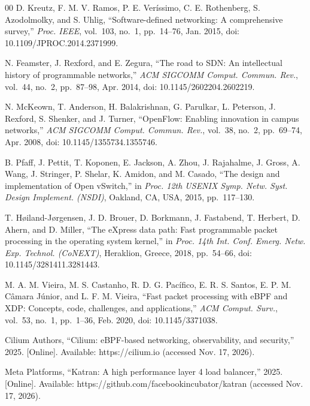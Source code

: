 \documentclass[conference]{IEEEtran}
\begin{document}
\begin{thebibliography}{00}
 D. Kreutz, F. M. V. Ramos, P. E. Ver\'issimo,
C. E. Rothenberg, S. Azodolmolky, and S. Uhlig, ``Software-defined networking:
A comprehensive survey,'' \textit{Proc. IEEE}, vol.~103, no.~1, pp.~14--76,
Jan. 2015, doi: 10.1109/JPROC.2014.2371999.

 N. Feamster, J. Rexford, and E. Zegura, ``The road
to SDN: An intellectual history of programmable networks,'' \textit{ACM
SIGCOMM Comput. Commun. Rev.}, vol.~44, no.~2, pp.~87--98, Apr. 2014,
doi: 10.1145/2602204.2602219.

 N. McKeown, T. Anderson, H. Balakrishnan,
G. Parulkar, L. Peterson, J. Rexford, S. Shenker, and J. Turner, ``OpenFlow:
Enabling innovation in campus networks,'' \textit{ACM SIGCOMM Comput. Commun.
Rev.}, vol.~38, no.~2, pp.~69--74, Apr. 2008, doi: 10.1145/1355734.1355746.

 B. Pfaff, J. Pettit, T. Koponen, E. Jackson, A. Zhou,
J. Rajahalme, J. Gross, A. Wang, J. Stringer, P. Shelar, K. Amidon, and
M. Casado, ``The design and implementation of Open vSwitch,'' in \textit{Proc.
12th USENIX Symp. Netw. Syst. Design Implement. (NSDI)}, Oakland, CA, USA,
2015, pp.~117--130.

 T. H{\o}iland-J{\o}rgensen, J. D. Brouer,
D. Borkmann, J. Fastabend, T. Herbert, D. Ahern, and D. Miller, ``The eXpress
data path: Fast programmable packet processing in the operating system
kernel,'' in \textit{Proc. 14th Int. Conf. Emerg. Netw. Exp. Technol.
(CoNEXT)}, Heraklion, Greece, 2018, pp.~54--66, doi: 10.1145/3281411.3281443.

 M. A. M. Vieira, M. S. Castanho, R. D. G. Pac\'ifico,
E. R. S. Santos, E. P. M. C\^amara J\'unior, and L. F. M. Vieira, ``Fast packet
processing with eBPF and XDP: Concepts, code, challenges, and applications,''
\textit{ACM Comput. Surv.}, vol.~53, no.~1, pp.~1--36, Feb. 2020,
doi: 10.1145/3371038.

 Cilium Authors, ``Cilium: eBPF-based networking,
observability, and security,'' 2025. [Online]. Available:
https://cilium.io (accessed Nov. 17, 2026).

 Meta Platforms, ``Katran: A high performance layer 4 load
balancer,'' 2025. [Online]. Available:
https://github.com/facebookincubator/katran (accessed Nov. 17, 2026).


\end{thebibliography}
\end{document}
